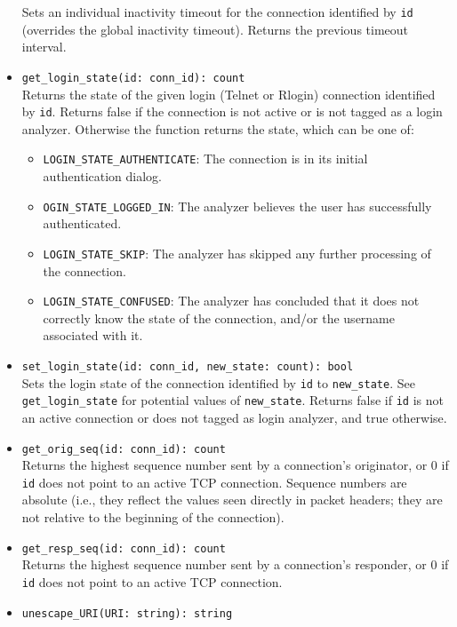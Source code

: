\documentclass[10pt,landscape]{article}
\begin{document}
\begin{multicols*}{2}
\begin{itemize}
    Sets an individual inactivity timeout for the connection identified by
    \texttt{id} (overrides the global inactivity timeout).
    Returns the previous timeout interval.
  \item \verb|get_login_state(id: conn_id): count|\\
    Returns the state of the given login (Telnet or Rlogin) connection
    identified by \texttt{id}. Returns false if the connection is not active
    or is not tagged as a login analyzer. Otherwise the function returns the
    state, which can be one of:
    \begin{itemize}
      \item \verb|LOGIN_STATE_AUTHENTICATE|: The connection is in its initial
        authentication dialog.
      \item \verb|OGIN_STATE_LOGGED_IN|: The analyzer believes the user has
        successfully authenticated.
      \item \verb|LOGIN_STATE_SKIP|: The analyzer has skipped any further
        processing of the connection.
      \item \verb|LOGIN_STATE_CONFUSED|: The analyzer has concluded that it
        does not correctly know the state of the connection, and/or the
        username associated with it.
    \end{itemize}
  \item \verb|set_login_state(id: conn_id, new_state: count): bool|\\
    Sets the login state of the connection identified by \verb|id| to
    \verb|new_state|. See \verb|get_login_state| for potential values of
    \verb|new_state|. Returns false if \texttt{id} is not an active connection
    or does not tagged as login analyzer, and true otherwise.
  \item \verb|get_orig_seq(id: conn_id): count|\\
    Returns the highest sequence number sent by a connection's originator, or 0
    if \verb|id| does not point to an active TCP connection. Sequence numbers
    are absolute (i.e., they reflect the values seen directly in packet
    headers; they are not relative to the beginning of the connection).
  \item \verb|get_resp_seq(id: conn_id): count|\\
    Returns the highest sequence number sent by a connection's responder, or 0
    if \verb|id| does not point to an active TCP connection.
  \item \verb|unescape_URI(URI: string): string|\\

\end{itemize}
\end{multicols*}
\end{document}

